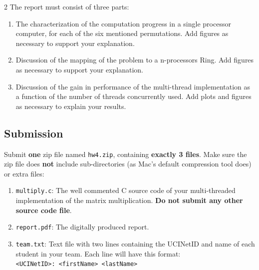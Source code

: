 \documentclass[12pt]{article}
\begin{document}
\begin{multicols}{2}
The report must consist of three parts:
\begin{enumerate}
\item The characterization of the computation progress in a single processor computer, for each of the six mentioned permutations. Add figures as necessary to support your explanation.
\item Discussion of the mapping of the problem to a n-processors Ring. Add figures as necessary to support your explanation.
\item Discussion of the gain in performance of the multi-thread implementation as a function of the number of threads concurrently used. Add plots and figures as necessary to explain your results.
\end{enumerate}


\subsection*{Submission}
Submit \textbf{one} zip file named \texttt{hw4.zip}, containing \textbf{exactly 3 files}. Make sure the zip file does \textbf{not} include sub-directories (as Mac's default compression tool does) or extra files:
\begin{enumerate}
\item \texttt{multiply.c}: The well commented C source code of your multi-threaded implementation of the matrix multiplication. \textbf{Do not submit any other source code file}.
\item \texttt{report.pdf}: The digitally produced report.
\item \texttt{team.txt}: Text file with two lines containing the UCINetID and name of each student in your team. Each line will have this format:\\
  \texttt{<UCINetID>: <firstName> <lastName>}
\end{enumerate}

\end{multicols}
\end{document}
